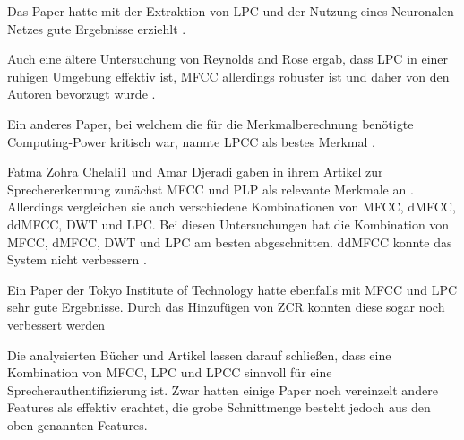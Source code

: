 Das Paper  hatte mit der Extraktion von LPC und der Nutzung eines Neuronalen Netzes gute Ergebnisse erziehlt \autocite[vgl.][S. 9]{kumar_rajeev_multilingual_nodate}.

Auch eine ältere Untersuchung von Reynolds and Rose ergab, dass LPC in einer ruhigen Umgebung effektiv ist, MFCC allerdings robuster ist und daher von den Autoren bevorzugt wurde \autocite[vgl.][S. 2f]{reynolds_robust_1995}.

Ein anderes Paper, bei welchem die für die Merkmalberechnung benötigte Computing-Power kritisch war, nannte LPCC als bestes Merkmal \autocite[vgl.][S. 7]{thullier_text-independent_2017}.

Fatma Zohra Chelali1 und Amar Djeradi gaben in ihrem Artikel zur Sprechererkennung zunächst MFCC und PLP als relevante Merkmale an \autocite[vgl.][S. 276]{chelali_text_2017}.
Allerdings vergleichen sie auch verschiedene Kombinationen von MFCC, dMFCC, ddMFCC, DWT und LPC.
Bei diesen Untersuchungen hat die Kombination von MFCC, dMFCC, DWT und LPC am besten abgeschnitten.
ddMFCC konnte das System nicht verbessern \autocite[vgl.][S. 276, 739]{chelali_text_2017}.

Ein Paper der Tokyo Institute of Technology hatte ebenfalls mit MFCC und LPC sehr gute Ergebnisse.
Durch das Hinzufügen von ZCR konnten diese sogar noch verbessert werden \autocite[vgl.][S. 4]{neha_chauhan_2019_2019}


Die analysierten Bücher und Artikel lassen darauf schließen, dass eine Kombination von MFCC, LPC und LPCC sinnvoll für eine Sprecherauthentifizierung ist.
Zwar hatten einige Paper noch vereinzelt andere Features als effektiv erachtet, die grobe Schnittmenge besteht jedoch aus den oben genannten Features.